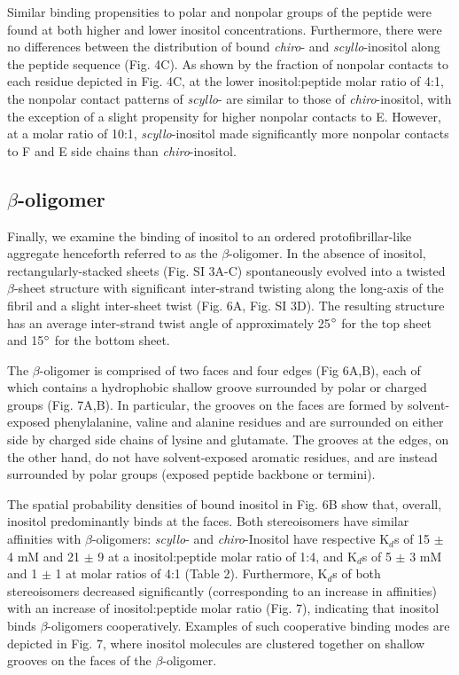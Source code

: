 Similar binding propensities to polar and nonpolar groups of the peptide were found at both higher and lower inositol concentrations. Furthermore, there were no differences between the distribution of bound \emph{chiro}- and \emph{scyllo}-inositol along the peptide sequence (Fig. 4C). As shown by the fraction of nonpolar contacts to each residue depicted in Fig. 4C, at the lower inositol:peptide molar ratio of 4:1, the nonpolar contact patterns of \emph{scyllo}- are similar to those of \emph{chiro}-inositol, with the exception of a slight propensity for higher nonpolar contacts to E. However, at a molar ratio of 10:1, \emph{scyllo}-inositol made significantly more nonpolar contacts to F and E side chains than \emph{chiro}-inositol.


\subsection{$\beta$-oligomer}

Finally, we examine the binding of inositol to an ordered protofibrillar-like aggregate henceforth referred to as the $\beta$-oligomer. In the absence of inositol, rectangularly-stacked sheets (Fig. SI 3A-C) spontaneously evolved into a twisted $\beta$-sheet structure with significant inter-strand twisting along the long-axis of the fibril and a slight inter-sheet twist (Fig. 6A, Fig. SI 3D). The resulting structure has an average inter-strand twist angle of approximately 25$^\circ$ for the top sheet and 15$^\circ$ for the bottom sheet. 

The $\beta$-oligomer is comprised of two faces and four edges (Fig 6A,B), each of which contains a hydrophobic shallow groove surrounded by polar or charged groups (Fig. 7A,B).  In particular, the grooves on the faces are formed by solvent-exposed phenylalanine, valine and alanine residues and are surrounded on either side by charged side chains of lysine and glutamate. The grooves at the edges, on the other hand, do not have solvent-exposed aromatic residues, and are instead surrounded by polar groups (exposed peptide backbone or termini).

The spatial probability densities of bound inositol in Fig. 6B show that, overall, inositol predominantly binds at the faces. Both stereoisomers have similar affinities with $\beta$-oligomers: \emph{scyllo}- and \emph{chiro}-Inositol have respective K$_d$s of 15 $\pm$ 4 mM and  21 $\pm$ 9 at a inositol:peptide molar ratio of 1:4, and K$_{d}$s of 5 $\pm$ 3 mM and 1 $\pm$ 1 at molar ratios of 4:1 (Table 2).   Furthermore, K$_d$s of both stereoisomers decreased significantly (corresponding to an increase in affinities) with an increase of inositol:peptide molar ratio (Fig. 7), indicating that inositol binds $\beta$-oligomers cooperatively.  Examples of such cooperative binding modes are depicted in Fig. 7, where inositol molecules are clustered together on shallow grooves on the faces of the $\beta$-oligomer.

